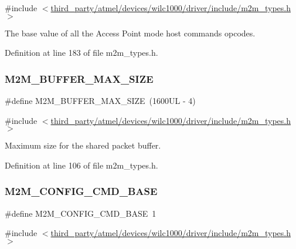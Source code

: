 {\ttfamily \#include $<$\hyperlink{m2m__types_8h}{third\+\_\+party/atmel/devices/wilc1000/driver/include/m2m\+\_\+types.\+h}$>$}

The base value of all the Access Point mode host commands opcodes. 

Definition at line 183 of file m2m\+\_\+types.\+h.

\mbox{\label{group__WlanDefines_ga6f3248a7b4183edf67a16a5cd445efea}} 
\subsubsection{\texorpdfstring{M2\+M\+\_\+\+B\+U\+F\+F\+E\+R\+\_\+\+M\+A\+X\+\_\+\+S\+I\+ZE}{M2M\_BUFFER\_MAX\_SIZE}}
{\footnotesize\ttfamily \#define M2\+M\+\_\+\+B\+U\+F\+F\+E\+R\+\_\+\+M\+A\+X\+\_\+\+S\+I\+ZE~(1600\+U\+L -\/ 4)}



{\ttfamily \#include $<$\hyperlink{m2m__types_8h}{third\+\_\+party/atmel/devices/wilc1000/driver/include/m2m\+\_\+types.\+h}$>$}

Maximum size for the shared packet buffer. 

Definition at line 106 of file m2m\+\_\+types.\+h.

\mbox{\label{group__WlanDefines_ga8cb2c74aa2cc33e2191ed3aa06ab5e9d}} 
\subsubsection{\texorpdfstring{M2\+M\+\_\+\+C\+O\+N\+F\+I\+G\+\_\+\+C\+M\+D\+\_\+\+B\+A\+SE}{M2M\_CONFIG\_CMD\_BASE}}
{\footnotesize\ttfamily \#define M2\+M\+\_\+\+C\+O\+N\+F\+I\+G\+\_\+\+C\+M\+D\+\_\+\+B\+A\+SE~1}



{\ttfamily \#include $<$\hyperlink{m2m__types_8h}{third\+\_\+party/atmel/devices/wilc1000/driver/include/m2m\+\_\+types.\+h}$>$}

